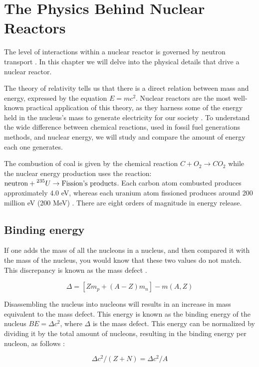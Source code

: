 \chapter{The Physics Behind Nuclear Reactors}
The level of interactions within a nuclear reactor is governed by neutron transport \cite{Stacey_2010}. In this chapter we will delve into the physical details that drive a nuclear reactor.

The theory of relativity tells us that there is a direct relation between mass and energy, expressed by the equation $E = mc^2$. Nuclear reactors are the most well-known practical application of this theory, as they harness some of the energy held in the nucleus's mass to generate electricity for our society \cite{Lewis_2014}. To understand the wide difference between chemical reactions, used in fossil fuel generations methods, and nuclear energy, we will study and compare the amount of energy  each one generates. 

The combustion of coal is given by the chemical reaction $C + O_{2} \rightarrow CO_{2} $ while the nuclear energy production uses the reaction: $\text{neutron} + \prescript{235}{}{U} \rightarrow \text{Fission's products}$. Each carbon atom combusted produces approximately 4.0 eV, whereas each uranium atom fissioned produces around 200 million eV (200 MeV) \cite{Lewis_2014}. There are eight orders of magnitude in energy release.

\section{Binding energy}
If one adds the mass of all the nucleons in a nucleus, and then compared it with the mass of the nucleus, you would know that these two values do not match. This discrepancy is known as the mass defect \cite{Stacey_2010}.

\begin{equation}
    \Delta = [Zm_{p}+(A-Z)m_{n}]-m(A,Z)
\end{equation}

Disassembling the nucleus into nucleons will results in an increase in mass equivalent to the mass defect. This energy is known as the binding energy of the nucleus $BE = \Delta c^2$, where $\Delta$ is the mass defect. This energy can be normalized by dividing it by the total amount of nucleons, resulting in the binding energy per nucleon, as follows \cite{Lewis_2014}:

\begin{equation}
    \Delta c^2/(Z+N) = \Delta c^2/A 
\end{equation}

